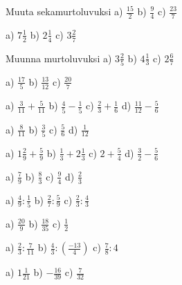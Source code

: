 \begin{tehtava}
Muuta sekamurtoluvuksi \quad
a) $\frac{15}{2}$ \qquad b) $\frac{9}{4}$ \qquad c) $\frac{23}{7}$
\begin{vastaus}
a) $7\frac{1}{2}$ \qquad b) $2\frac{1}{4}$ \qquad c) $3\frac{2}{7}$
\end{vastaus}
\end{tehtava}

\begin{tehtava}
Muunna murtoluvuksi \quad
a) $3\frac{2}{5}$ \qquad b) $4\frac{1}{3}$ \qquad c) $2\frac{6}{7}$
\begin{vastaus}
a) $\frac{17}{5}$ \qquad b) $\frac{13}{12}$ \qquad c) $\frac{20}{7}$
\end{vastaus}
\end{tehtava}

\begin{tehtava}
a) $\frac{3}{11}+\frac{5}{11}$ \qquad b) $\frac{4}{5}-\frac{1}{5}$ \qquad c) $\frac{2}{3}+\frac{1}{6}$ \qquad
d) $ \frac{11}{12}-\frac{5}{6}$
\begin{vastaus}
a) $\frac{8}{11}$ \qquad b) $\frac{3}{5}$ \qquad c) $\frac{5}{6}$ \qquad d) $\frac{1}{12}$
\end{vastaus}
\end{tehtava}

\begin{tehtava}
a) $1\frac{2}{9}+\frac{5}{9}$ \qquad b) $\frac{1}{3}+2\frac{1}{3}$ \qquad c) $2+\frac{5}{4}$ \qquad
d) $ \frac{3}{2}-\frac{5}{6}$
\begin{vastaus}
a) $\frac{7}{9}$ \qquad b) $\frac{8}{3}$ \qquad c) $\frac{9}{4}$ \qquad d) $\frac{2}{3}$
\end{vastaus}
\end{tehtava}

\begin{tehtava}
a) $\frac{4}{9} : \frac{1}{5}$ \qquad b) $\frac{2}{7}:\frac{5}{9}$ \qquad c) $\frac{2}{3}:\frac{4}{3}$
\begin{vastaus}
a) $\frac{20}{9}$ \qquad b) $\frac{18}{35}$ \qquad c) $\frac{1}{2}$
\end{vastaus}
\end{tehtava}

\begin{tehtava}
a) $\frac{2}{3} : \frac{7}{11}$ \qquad b) $\frac{4}{3}:(\frac{-13}{4})$ \qquad c) $\frac{7}{8}:4$
\begin{vastaus}
a) $1\frac{1}{21}$ \qquad b) $-\frac{16}{39}$ \qquad c) $\frac{7}{32}$
\end{vastaus}
\end{tehtava}

